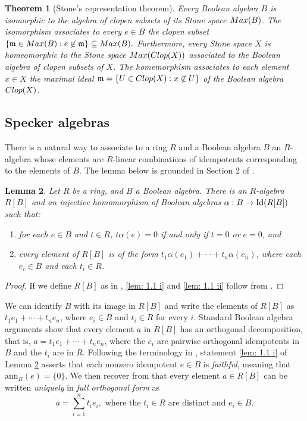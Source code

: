 \documentclass[11pt]{amsart}
\def\m{{\mathfrak m}} %
\newtheorem{theorem}{Theorem}[section]
\newtheorem{lemma}[theorem]{Lemma}
\theoremstyle{definition}
\def\ann{\mathrm{ann}}
\def\Id{\mbox{\rm Id}}
\begin{document}
\begin{theorem}[Stone's representation theorem]\label{thm: Stone's repr. thm}
 Every Boolean algebra $B$ is isomorphic to the algebra of clopen subsets of its Stone space ${\rm Max}(B)$. The isomorphism associates to every $e\in B$ the clopen subset $\{\m\in {\rm Max}(B) : e\not\in \m\}\subseteq {\rm Max}(B).$ Furthermore, every Stone space $X$ is homeomorphic to the Stone space ${\rm Max}({\rm Clop}(X))$ associated to the Boolean algebra of clopen subsets of $X$. The homemorphism associates to each element $x\in X$ the maximal ideal $\m=\{U\in {\rm Clop}(X) : x\not \in U\}$ of the Boolean algebra ${\rm Clop}(X)$.
\end{theorem}

\subsection{Specker algebras}\label{subsec: Specker algebra} There is a natural way to associate to a ring $R$ and a Boolean algebra $B$ an $R$-algebra whose elements are $R$-linear combinations of idempotents corresponding to the elements of $B$. The lemma below is grounded in Section 2 of \cite{BMMO}. 

\begin{lemma}\label{lem: 1.1}
Let $R$ be a ring, and $B$ a Boolean algebra. 
There is an $R$-algebra $R[B]$ and an injective homomorphism of Boolean algebras $\alpha:B \rightarrow \Id(R[B])$ such that:
\begin{enumerate}[label=\textup{(\roman{*})}, mode=unboxed]
    \item\label{lem: 1.1 i} for each $ e \in B$ and $t\in R$,  $t\alpha(e) = 0$ if and only if $t=0$ or $e=0$, and
    \item\label{lem: 1.1 ii} every element of $R[B]$ is of the form $ t_1\alpha(e_1) + \cdots + t_n\alpha(e_n)$, where each $e_i \in B$ and each $t_i \in R$.
\end{enumerate}
 \end{lemma}
\begin{proof}
    If we define $R[B]$ as in \cite[Def.~2.4]{BMMO}, \ref{lem: 1.1 i} and \ref{lem: 1.1 ii} follow from \cite[Lemma~2.6]{BMMO}.
\end{proof}

We can identify $B$ with its image in $R[B]$ and write the elements of $R[B]$ as $t_1e_1 + \cdots + t_ne_n$, where $e_i\in B$ and $t_i\in R$ for every $i$. Standard Boolean algebra arguments show that every element $a$ in $R[B]$ has an orthogonal decomposition, that is, $a =t_1e_1 +\cdots +t_ne_n$, where the $e_i$ are pairwise orthogonal idempotents in $B$ and the $t_i$ are in $R$. Following the terminology in \cite{BMMO}, statement \ref{lem: 1.1 i} of Lemma \ref{lem: 1.1} asserts that each nonzero idempotent $e \in B$ is {\it faithful}, meaning that $\ann_R(e)=\{0\}$. We then recover from \cite[Lemma 2.1]{BMMO} that every element $a\in R[B]$ can be written {\it uniquely} in {\it full orthogonal form} as
\begin{equation*}
    a=\sum_{i=1}^n t_i e_i, \text{ where the }t_i\in R\text{ are distinct and }e_i\in B.
\end{equation*}
\end{document}
